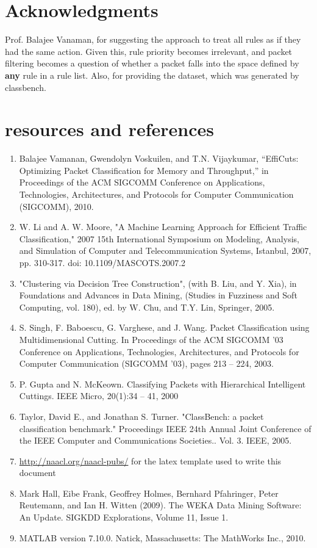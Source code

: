 \documentclass[11pt,letterpaper]{article}
\begin{document}
\begin{widetext}
\section*{Acknowledgments}

Prof. Balajee Vanaman, for suggesting the approach to treat all rules as if they had the same action. Given this, rule priority becomes irrelevant, and packet filtering becomes a question of whether a packet falls into the space defined by {\bf any } rule in a rule list. Also, for providing the dataset, which was generated by classbench. 

\section{resources and references}
\begin{enumerate}
\item Balajee Vamanan, Gwendolyn Voskuilen, and T.N. Vijaykumar, “EffiCuts: Optimizing Packet Classification for Memory and Throughput,” in Proceedings of the ACM SIGCOMM Conference on Applications, Technologies, Architectures, and Protocols for Computer Communication (SIGCOMM), 2010.
\item W. Li and A. W. Moore, "A Machine Learning Approach for Efficient Traffic Classification," 2007 15th International Symposium on Modeling, Analysis, and Simulation of Computer and Telecommunication Systems, Istanbul, 2007, pp. 310-317.
doi: 10.1109/MASCOTS.2007.2
\item "Clustering via Decision Tree Construction", (with B. Liu, and Y. Xia), in Foundations and Advances in Data Mining, (Studies in Fuzziness and Soft Computing, vol. 180), ed. by W. Chu, and T.Y. Lin, Springer, 2005.
\item  S. Singh, F. Baboescu, G. Varghese, and J. Wang. Packet Classification using Multidimensional Cutting. In Proceedings of the ACM SIGCOMM ’03 Conference on Applications, Technologies, Architectures, and Protocols for Computer Communication (SIGCOMM ’03), pages 213 – 224, 2003.

\item P. Gupta and N. McKeown. Classifying Packets with Hierarchical Intelligent Cuttings. IEEE Micro, 20(1):34 – 41, 2000

\item Taylor, David E., and Jonathan S. Turner. "ClassBench: a packet classification benchmark." Proceedings IEEE 24th Annual Joint Conference of the IEEE Computer and Communications Societies.. Vol. 3. IEEE, 2005.
\item \url{http://naacl.org/naacl-pubs/} for the latex template used to write this document
\item Mark Hall, Eibe Frank, Geoffrey Holmes, Bernhard Pfahringer, Peter Reutemann, and Ian H. Witten (2009). The WEKA Data Mining Software: An Update. SIGKDD Explorations, Volume 11, Issue 1.
\item MATLAB version 7.10.0. Natick, Massachusetts: The MathWorks Inc., 2010.
\end{enumerate}



\end{widetext}
\end{document}
